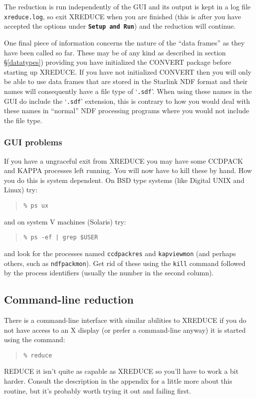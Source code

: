 \documentclass[twoside,11pt]{article}
\newcommand{\hyperref}[4]{#2\ref{#4}#3}
\newcommand{\htmlref}[2]{#1}
\newcommand{\xref}[3]{#1}
\renewcommand{\_}{\texttt{\symbol{95}}}
\newenvironment{myquote}{\begin{quote}\begin{small}}{\end{small}\end{quote}}
\newcommand{\butt}[1]{{\small \bf \tt #1}}
\newcommand{\text}[1]{{\small \tt #1}}
\newcommand{\routine}[1]{{\sc #1}}
\newcommand{\xroutine}[1]{\htmlref{{\sc #1}}{#1}}
\begin{document}
The reduction is run independently of the GUI and its output is kept
in a log file \text{xreduce.log}, so exit \routine{XREDUCE} when you
are finished (this is after you have accepted the options under
\butt{Setup and Run}) and the reduction will continue.

One final piece of information concerns the nature of the ``data
frames'' as they have been called so far. These may be of any kind as
described \hyperref{later}{in section \S}{}{datatypes}) providing you
have initialized the \xref{CONVERT}{sun55}{} package before starting
up \routine{XREDUCE}.  If you have not initialized CONVERT then you
will only be able to use data frames that are stored in the Starlink
\xref{NDF}{sun33}{} format and their names will consequently have a
file type of `\text{.sdf}'. When using these names in the GUI do
include the `\text{.sdf}' extension, this is contrary to how you would
deal with these names in ``normal'' NDF processing programs where you
would not include the file type.

\subsubsection{GUI problems}
If you have a ungraceful exit from \xroutine{XREDUCE} you may have
some CCDPACK and \xref{KAPPA}{sun95}{} processes left running.  You
will now have to kill these by hand.  How you do this is system
dependent.  On BSD type systems (like Digital UNIX and Linux) try:
\begin{myquote}
\begin{verbatim}
% ps ux
\end{verbatim}
\end{myquote}
and on system V machines (Solaris) try:
\begin{myquote}
\begin{verbatim}
% ps -ef | grep $USER
\end{verbatim}
\end{myquote}
and look for the processes named \text{ccdpack\_res} and
\text{kapview\_mon} (and perhaps others, such as
\text{ndfpack\_mon}).
Get rid of these using the \text{kill} command followed by the
process identifiers (usually the number in the second column).

\subsection{Command-line reduction}
There is a command-line interface with similar abilities to
\xroutine{XREDUCE} if you do not have access to an X display (or prefer
a command-line anyway) it is started using the command:
\begin{myquote}
\begin{verbatim}
% reduce
\end{verbatim}
\end{myquote}
\xroutine{REDUCE} it isn't quite as capable as \routine{XREDUCE} so
you'll have to work a bit harder.  Consult the description in the
appendix for a little more about this routine, but it's probably
worth trying it out and failing first.
\end{document}
